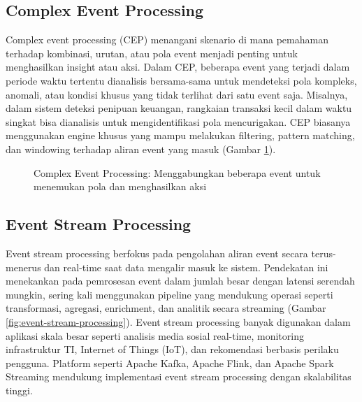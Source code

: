 \subsection{Complex Event Processing}
Complex event processing (CEP) menangani skenario di mana pemahaman terhadap kombinasi, urutan, atau pola event menjadi penting untuk menghasilkan insight atau aksi. Dalam CEP, beberapa event yang terjadi dalam periode waktu tertentu dianalisis bersama-sama untuk mendeteksi pola kompleks, anomali, atau kondisi khusus yang tidak terlihat dari satu event saja. Misalnya, dalam sistem deteksi penipuan keuangan, rangkaian transaksi kecil dalam waktu singkat bisa dianalisis untuk mengidentifikasi pola mencurigakan. CEP biasanya menggunakan engine khusus yang mampu melakukan filtering, pattern matching, dan windowing terhadap aliran event yang masuk (Gambar \ref{fig:cep}).

\begin{figure}[h]
	\centering
	\caption{Complex Event Processing: Menggabungkan beberapa event untuk menemukan pola dan menghasilkan aksi}
	\label{fig:cep}
\end{figure}

\subsection{Event Stream Processing}
Event stream processing berfokus pada pengolahan aliran event secara terus-menerus dan real-time saat data mengalir masuk ke sistem. Pendekatan ini menekankan pada pemrosesan event dalam jumlah besar dengan latensi serendah mungkin, sering kali menggunakan pipeline yang mendukung operasi seperti transformasi, agregasi, enrichment, dan analitik secara streaming (Gambar \ref{fig:event-stream-processing}). Event stream processing banyak digunakan dalam aplikasi skala besar seperti analisis media sosial real-time, monitoring infrastruktur TI, Internet of Things (IoT), dan rekomendasi berbasis perilaku pengguna. Platform seperti Apache Kafka, Apache Flink, dan Apache Spark Streaming mendukung implementasi event stream processing dengan skalabilitas tinggi. 


